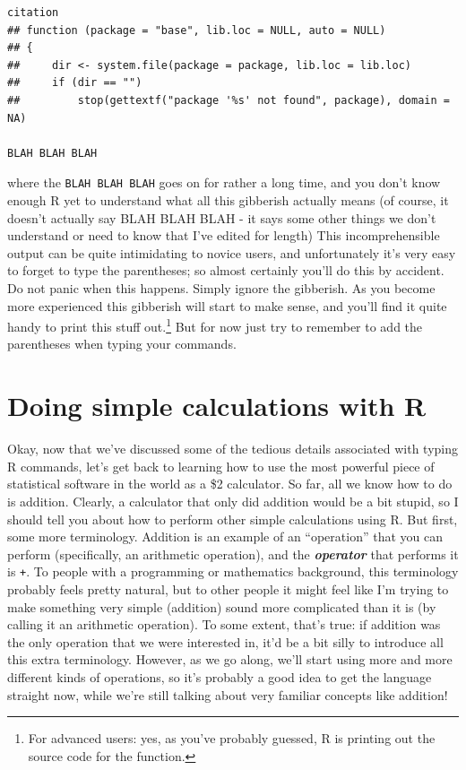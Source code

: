 \documentclass[
]{book}
\begin{document}
\begin{verbatim}
citation
## function (package = "base", lib.loc = NULL, auto = NULL) 
## {
##     dir <- system.file(package = package, lib.loc = lib.loc)
##     if (dir == "") 
##         stop(gettextf("package '%s' not found", package), domain = NA)

BLAH BLAH BLAH
\end{verbatim}

where the \texttt{BLAH\ BLAH\ BLAH} goes on for rather a long time, and you don't know enough R yet to understand what all this gibberish actually means (of course, it doesn't actually say BLAH BLAH BLAH - it says some other things we don't understand or need to know that I've edited for length) This incomprehensible output can be quite intimidating to novice users, and unfortunately it's very easy to forget to type the parentheses; so almost certainly you'll do this by accident. Do not panic when this happens. Simply ignore the gibberish. As you become more experienced this gibberish will start to make sense, and you'll find it quite handy to print this stuff out.\footnote{For advanced users: yes, as you've probably guessed, R is printing out the source code for the function.} But for now just try to remember to add the parentheses when typing your commands.

\hypertarget{arithmetic}{%
\section{Doing simple calculations with R}\label{arithmetic}}

Okay, now that we've discussed some of the tedious details associated with typing R commands, let's get back to learning how to use the most powerful piece of statistical software in the world as a \$2 calculator. So far, all we know how to do is addition. Clearly, a calculator that only did addition would be a bit stupid, so I should tell you about how to perform other simple calculations using R. But first, some more terminology. Addition is an example of an ``operation'' that you can perform (specifically, an arithmetic operation), and the \textbf{\emph{operator}} that performs it is \texttt{+}. To people with a programming or mathematics background, this terminology probably feels pretty natural, but to other people it might feel like I'm trying to make something very simple (addition) sound more complicated than it is (by calling it an arithmetic operation). To some extent, that's true: if addition was the only operation that we were interested in, it'd be a bit silly to introduce all this extra terminology. However, as we go along, we'll start using more and more different kinds of operations, so it's probably a good idea to get the language straight now, while we're still talking about very familiar concepts like addition!
\end{document}
